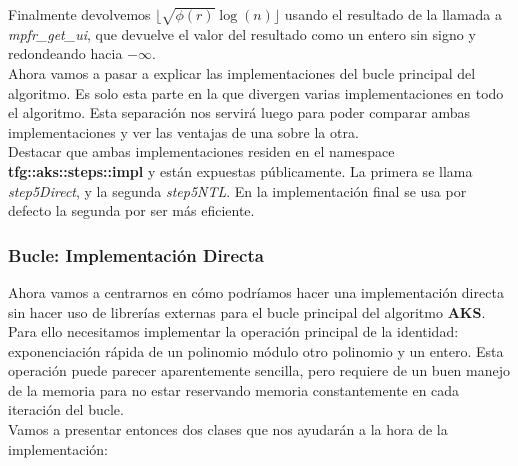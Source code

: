 Finalmente devolvemos $\lfloor \sqrt{\phi(r)}\log(n) \rfloor$ usando el resultado de la llamada a \textit{mpfr\_get\_ui}, que devuelve el valor del resultado como un entero sin signo y redondeando hacia $-\infty$.\\

Ahora vamos a pasar a explicar las implementaciones del bucle principal del algoritmo. Es solo esta parte en la que divergen varias implementaciones en todo el algoritmo. Esta separación nos servirá luego para poder comparar ambas implementaciones y ver las ventajas de una sobre la otra.\\

Destacar que ambas implementaciones residen en el namespace \textbf{tfg::aks::steps::impl} y están expuestas públicamente. La primera se llama \textit{step5Direct}, y la segunda \textit{step5NTL}. En la implementación final se usa por defecto la segunda por ser más eficiente.

\subsubsection{Bucle: Implementación Directa}

Ahora vamos a centrarnos en cómo podríamos hacer una implementación directa sin hacer uso de librerías externas para el bucle principal del algoritmo \textbf{AKS}.\\

Para ello necesitamos implementar la operación principal de la identidad: exponenciación rápida de un polinomio módulo otro polinomio y un entero. Esta operación puede parecer aparentemente sencilla, pero requiere de un buen manejo de la memoria para no estar reservando memoria constantemente en cada iteración del bucle.\\

Vamos a presentar entonces dos clases que nos ayudarán a la hora de la implementación:


